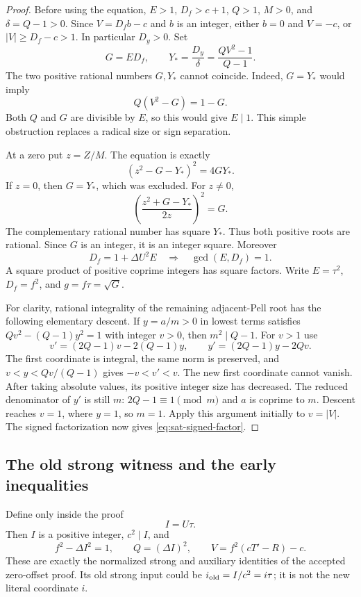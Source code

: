 \begin{proof}
Before using the equation, $E>1$, $D_f>c+1$, $Q>1$, $M>0$, and
$\delta=Q-1>0$.  Since $V=D_fb-c$ and $b$ is an integer, either
$b=0$ and $V=-c$, or $|V|\ge D_f-c>1$.  In particular $D_y>0$.
Set
\[
 G=ED_f,\qquad Y_* =\frac{D_y}{\delta}
       =\frac{QV^2-1}{Q-1}.
\]
The two positive rational numbers $G,Y_*$ cannot coincide.  Indeed,
$G=Y_*$ would imply
\[
 Q(V^2-G)=1-G.
\]
Both $Q$ and $G$ are divisible by $E$, so this would give $E\mid1$.
This simple obstruction replaces a radical size or sign separation.

At a zero put $z=Z/M$.  The equation is exactly
\[
 (z^2-G-Y_*)^2=4GY_*.
\]
If $z=0$, then $G=Y_*$, which was excluded.  For $z\ne0$,
\[
 \left(\frac{z^2+G-Y_*}{2z}\right)^2=G.
\]
The complementary rational number has square $Y_*$.  Thus both
positive roots are rational.  Since $G$ is an integer, it is an
integer square.  Moreover
\[
 D_f=1+\Delta U^2E\quad\Longrightarrow\quad\gcd(E,D_f)=1.
\]
A square product of positive coprime integers has square factors.
Write $E=\tau^2$, $D_f=f^2$, and $g=f\tau=\sqrt G$.

For clarity, rational integrality of the remaining adjacent-Pell
root has the following elementary descent.  If $y=a/m>0$ in lowest
terms satisfies $Qv^2-(Q-1)y^2=1$ with integer $v>0$, then
$m^2\mid Q-1$.  For $v>1$ use
\[
 v'=(2Q-1)v-2(Q-1)y,
 \qquad y'=(2Q-1)y-2Qv.
\]
The first coordinate is integral, the same norm is preserved, and
$v<y<Qv/(Q-1)$ gives $-v<v'<v$.  The new first coordinate cannot
vanish.  After taking absolute values, its positive integer size
has decreased.  The reduced denominator of $y'$ is still $m$:
$2Q-1\equiv1\pmod m$ and $a$ is coprime to $m$.  Descent reaches
$v=1$, where $y=1$, so $m=1$.  Apply this argument initially to
$v=|V|$.  The signed factorization now gives
\eqref{eq:sat-signed-factor}.
\end{proof}

\subsection{The old strong witness and the early inequalities}

Define only inside the proof
\begin{equation}
 I=U\tau.
 \label{eq:sat-proof-I}
\end{equation}
Then $I$ is a positive integer, $c^2\mid I$, and
\begin{equation}
 f^2-\Delta I^2=1,\qquad Q=(\Delta I)^2,
 \qquad V=f^2(cT'-R)-c.
 \label{eq:sat-restored-kernels}
\end{equation}
These are exactly the normalized strong and auxiliary identities
of the accepted zero-offset proof.  Its old strong input could be
$i_{\rm old}=I/c^2=i\tau$; it is not the new literal coordinate $i$.

